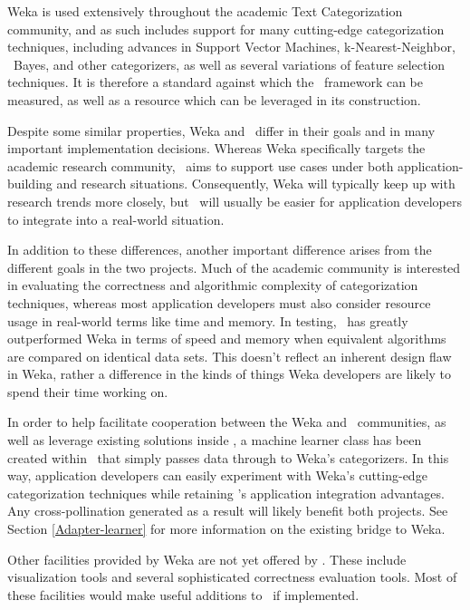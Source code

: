 Weka is used extensively throughout the academic Text Categorization
community, and as such includes support for many cutting-edge
categorization techniques, including advances in Support Vector
Machines, k-Nearest-Neighbor, \naive\ Bayes, and other categorizers, as
well as several variations of feature selection techniques.  It is
therefore a standard against which the \aicat\ framework can
be measured, as well as a resource which can be leveraged in its
construction.

Despite some similar properties, Weka and \aicat\ differ in
their goals and in many important implementation decisions.  Whereas
Weka specifically targets the academic research community,
\aicat\ aims to support use cases under both
application-building and research situations.
Consequently, Weka will typically keep up with research trends more
closely, but \aicat\ will usually be easier for application
developers to integrate into a real-world situation.

In addition to these differences, another important difference arises
from the different goals in the two projects.  Much of the academic
community is interested in evaluating the correctness and algorithmic
complexity of categorization techniques, whereas most application
developers must also consider resource usage in real-world terms like
time and memory.  In testing, \aicat\ has greatly outperformed
Weka in terms of speed and memory when equivalent algorithms are
compared on identical data sets.  This doesn't reflect an inherent
design flaw in Weka, rather a difference in the kinds of things Weka
developers are likely to spend their time working on.

In order to help facilitate cooperation between the Weka and
\aicat\ communities, as well as leverage existing solutions
inside \aicat, a machine learner class has been created
within \aicat\ that simply passes data through to Weka's
categorizers.  In this way, application developers can easily
experiment with Weka's cutting-edge categorization techniques while
retaining \aicat's application integration advantages.  Any
cross-pollination generated as a result will likely benefit both
projects.  See Section \ref{Adapter-learner} for more information on
the existing bridge to Weka.

Other facilities provided by Weka are not yet offered by
\aicat.  These include visualization tools and several
sophisticated correctness evaluation tools.  Most of these
facilities would make useful additions to \aicat\ if
implemented.


